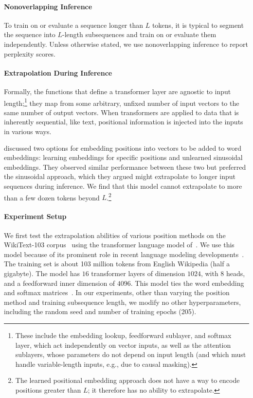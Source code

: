 \paragraph{Nonoverlapping Inference}
To train on or evaluate a sequence longer than $L$ tokens, it is typical to segment the sequence into $L$-length subsequences and train on or evaluate them independently.  Unless otherwise stated, we use nonoverlapping inference to report perplexity scores. %

\paragraph{Extrapolation During Inference} 
Formally, the functions that define a transformer layer are agnostic to input length;\footnote{These include the embedding lookup, feedforward sublayer, and softmax layer, which act independently on vector inputs, as well as the attention sublayers, whose parameters do not depend on input length (and which must handle variable-length inputs, e.g., due to causal masking).  %
} they map from some arbitrary, unfixed number of input vectors to the same number of output vectors.  When transformers are applied to data that is inherently sequential, like text, %
positional information is injected into the inputs in various ways. 

\citet{vaswani}
discussed two options for embedding positions into vectors to be added to word %
embeddings:  learning embeddings for specific positions and unlearned sinusoidal embeddings.  They observed similar performance between these two but preferred the sinusoidal approach, which they argued might extrapolate to longer input sequences during inference.  %
We find that this model cannot extrapolate to more than a few dozen tokens beyond $L$.\footnote{The learned positional embedding approach does not have a way to encode positions greater than $L$; it therefore has no ability to extrapolate.}

\paragraph{Experiment Setup}
We first test the extrapolation abilities of various position methods on the WikiText-103 corpus~\citep{pointer} using the transformer language model of~\cite{baevski}. 
We use this model because of its prominent role in recent  language modeling developments~\citep{khandelwal20generalization, shortformer}. The training set is about 103 million tokens from  English Wikipedia (half a gigabyte).  The  model has $16$ transformer layers of dimension $1024$, with $8$ heads, and a feedforward inner dimension of $4096$. This model ties the word embedding and softmax matrices~\citep{tying, inan2017}. %
In our experiments, other than varying the position method and training subsequence length, we modify no other hyperparameters, including the random seed and number of training epochs (205). 

